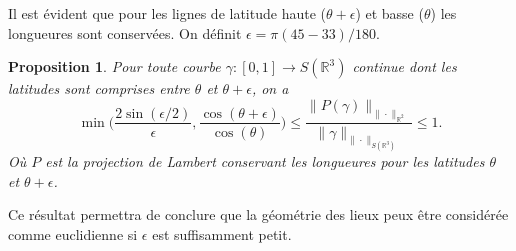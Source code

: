 \documentclass[a4paper,10pt]{article}
\newtheorem{proposition}{Proposition}
\begin{document}
Il est évident que pour les lignes de latitude haute ($\theta+ \epsilon$) et basse ($\theta$) les longueures sont conservées. On définit $\epsilon=\pi (45-33)/180$. 


\begin{proposition}
	Pour toute courbe $\gamma: [0,1] \to S(\mathbb{R}^3)$ continue dont les latitudes sont comprises entre $\theta$ et $\theta+\epsilon$, on a 
	\[\min\Big(\frac{2\sin(\epsilon/2)}{\epsilon},\frac{\cos(\theta+\epsilon)}{\cos(\theta)} \Big)\leq \frac{\|P(\gamma)\|_{\|\cdot\|_{\mathbb{R}^2}}}{\|\gamma\|_{\|\cdot\|_{S(\mathbb{R}^3)}}} \leq 1.\]
	Où $P$ est la projection de Lambert conservant les longueures pour les latitudes $\theta$ et $\theta+\epsilon$.
\end{proposition} 
Ce résultat permettra de conclure que la géométrie des lieux peux être considérée comme euclidienne si $\epsilon$ est suffisamment petit.
\end{document}
